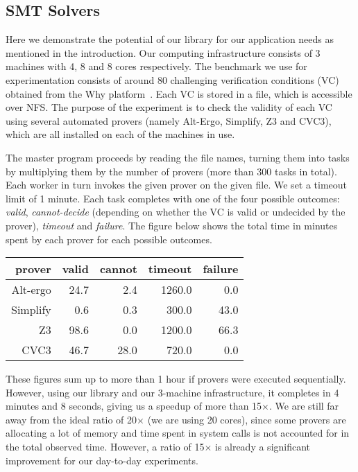 \documentclass[preprint]{sigplanconf}
\begin{document}
\subsection{SMT Solvers}

Here we demonstrate the potential of our library for our application
needs as mentioned in the introduction. Our computing
infrastructure consists of 3 machines with 4, 8 and 8 cores
respectively. The benchmark we use for
experimentation consists of around 80 challenging verification conditions
(VC) obtained from the Why platform~\cite{filliatre07cav}.  Each
VC is stored in a file, which is accessible over
NFS. The purpose of the experiment is to check the validity of each VC
using several automated provers (namely Alt-Ergo, Simplify, Z3 and CVC3),
which are all installed on each of the machines in use.

The master program proceeds by reading the file names, turning them
into tasks by multiplying them by the number of provers (more than
300 tasks in total).
Each worker in turn invokes the given prover on the given file.
We set a timeout limit of 1 minute.
Each task completes with one of the four possible outcomes: \emph{valid},
\emph{cannot-decide} (depending on
whether the VC is valid or undecided by the prover), 
\emph{timeout} and \emph{failure}.
The figure below shows the total time in minutes spent by each prover
for each possible outcomes.
\begin{center}
  \begin{tabular}{|r|r|r|r|r|}
    \hline
    prover   & valid & cannot & timeout & failure
    \\\hline\hline
    Alt-ergo &  24.7  &  2.4  & 1260.0 &   0.0       
    \\\hline
    Simplify &   0.6  &  0.3  &  300.0 &  43.0   
    \\\hline
    Z3       &  98.6  &  0.0  & 1200.0 &  66.3    
    \\\hline
    CVC3     &  46.7  & 28.0  &  720.0 &   0.0   
    \\\hline
  \end{tabular}
\end{center}
These figures sum up to more than 1 hour if provers were executed
sequentially. However, using our library and our 3-machine
infrastructure, it completes in 4 minutes and 8 seconds, giving us a
speedup of more than 15$\times$. We are still far away from the ideal
ratio of 20$\times$ (we are using 20 cores), since some provers are
allocating a lot of memory and time spent in system calls is not
accounted for in the total observed time. However, a ratio of
15$\times$ is already a significant improvement for our day-to-day
experiments. 
\end{document}
